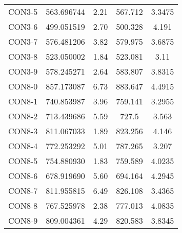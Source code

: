 \begin{table}[ht]
\begin{tabular}{c c c c c}
CON3-5 & 563.696744 & 2.21 & 567.712 & 3.3475 \\
CON3-6 & 499.051519 & 2.70 & 500.328 & 4.191 \\
CON3-7 & 576.481206 & 3.82 & 579.975 & 3.6875 \\
CON3-8 & 523.050002 & 1.84 & 523.081 & 3.11 \\
CON3-9 & 578.245271 & 2.64 & 583.807 & 3.8315 \\
CON8-0 & 857.173087 & 6.73 & 883.647 & 4.4915 \\
CON8-1 & 740.853987 & 3.96 & 759.141 & 3.2955 \\
CON8-2 & 713.439686 & 5.59 & 727.5 & 3.563 \\
CON8-3 & 811.067033 & 1.89 & 823.256 & 4.146 \\
CON8-4 & 772.253292 & 5.01 & 787.265 & 3.207 \\
CON8-5 & 754.880930 & 1.83 & 759.589 & 4.0235 \\
CON8-6 & 678.919690 & 5.60 & 694.164 & 4.2945 \\
CON8-7 & 811.955815 & 6.49 & 826.108 & 3.4365 \\
CON8-8 & 767.525978 & 2.38 & 777.013 & 4.0835 \\
CON8-9 & 809.004361 & 4.29 & 820.583 & 3.8345 \\
[1ex]\hline
\end{tabular}
\label{table:nonlin}
\end{table} \clearpage
